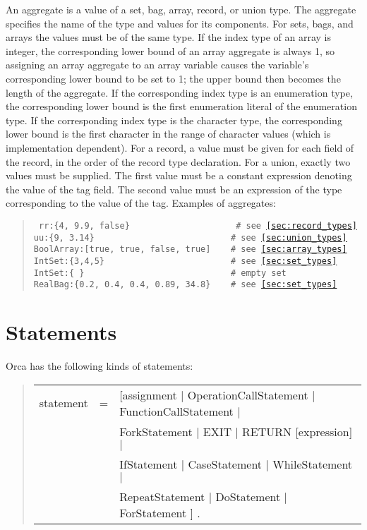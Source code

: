 \documentclass[10pt]{article}
\newenvironment{grammar}
{\begin{quote} \begin{tabular}{p{3.8cm} l l}}
{\end{tabular}\end{quote}}
\begin{document}
An aggregate is a value of a set, bag, array, record, or union type.
The aggregate specifies the name of the type and values for its components.
For sets, bags, and arrays the values must be of the same type.
If the index type of an array is integer, the corresponding lower bound
of an array aggregate is always 1, so assigning an
array aggregate to an array variable causes the variable's corresponding lower bound
to be set to 1; the upper bound then becomes the length of the aggregate.
If the corresponding index type is an enumeration type, the
corresponding lower bound is the first enumeration literal of the
enumeration type. If the corresponding index type is the character type,
the corresponding lower bound is the first character in the range
of character values (which is implementation dependent).
For a record, a value must be given for each field of the record, in the
order of the record type declaration.
For a union, exactly two values must be supplied.
The first value must be a constant expression denoting the value of
the tag field.
The second value must be an expression of the type corresponding to
the value of the tag.
Examples of aggregates:
\begin{quote}\tt
rr:\{4, 9.9, false\}~~~~~~~~~~~~~~~~~~~~~\# see \ref{sec:record_types} \\
uu:\{9, 3.14\}~~~~~~~~~~~~~~~~~~~~~~~~~~~\# see \ref{sec:union_types} \\
BoolArray:[true, true, false, true]~~~~\# see \ref{sec:array_types} \\
IntSet:\{3,4,5\}~~~~~~~~~~~~~~~~~~~~~~~~~\# see \ref{sec:set_types} \\
IntSet:\{ \}~~~~~~~~~~~~~~~~~~~~~~~~~~~~~\# empty set \\
RealBag:\{0.2, 0.4, 0.4, 0.89, 34.8\}~~~~\# see \ref{sec:set_types}
\end{quote}
\section{Statements}

Orca has the following kinds of statements:
\begin{grammar}
statement & = & [assignment $|$ OperationCallStatement $|$ FunctionCallStatement $|$ \\
& & ForkStatement $|$ EXIT  $|$ RETURN [expression]  $|$ \\
& & IfStatement $|$ CaseStatement $|$ WhileStatement $|$ \\
& & RepeatStatement $|$ DoStatement $|$ ForStatement  ] .
\end{grammar}
\end{document}
